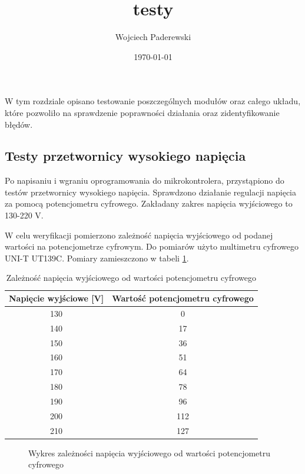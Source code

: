 \documentclass[../main.tex]{subfiles}
\author{Wojciech Paderewski}
\date{\today}
\title{testy}
\begin{document}
W tym rozdziale opisano testowanie poszczególnych 
modułów oraz całego układu, które pozwoliło na sprawdzenie poprawności działania oraz zidentyfikowanie błędów.

\subsection{Testy przetwornicy wysokiego napięcia}
Po napisaniu i wgraniu oprogramowania do mikrokontrolera, przystąpiono do testów przetwornicy wysokiego napięcia.
Sprawdzono działanie regulacji napięcia za pomocą potencjometru cyfrowego. Zakładany zakres napięcia wyjściowego to 130-220 V.

W celu weryfikacji pomierzono zależność napięcia wyjściowego od podanej wartości na potencjometrze cyfrowym.
Do pomiarów użyto multimetru cyfrowego UNI-T UT139C. Pomiary zamieszczono w tabeli \ref{tab:voltage}.

\begin{table}[H]
    \centering
    \begin{tabular}{|c|c|}
        \hline
        Napięcie wyjściowe [V] & Wartość potencjometru cyfrowego \\
        \hline
        130 & 0 \\
        140 & 17 \\
        150 & 36 \\
        160 & 51 \\
        170 & 64 \\
        180 & 78 \\
        190 & 96 \\
        200 & 112 \\
        210 & 127 \\
        \hline
    \end{tabular}
    \caption{Zależność napięcia wyjściowego od wartości potencjometru cyfrowego}
    \label{tab:voltage}
\end{table}

\begin{figure}[H]
  \centering
  \caption{Wykres zależności napięcia wyjściowego od wartości potencjometru cyfrowego}
\end{figure}
\end{document}
